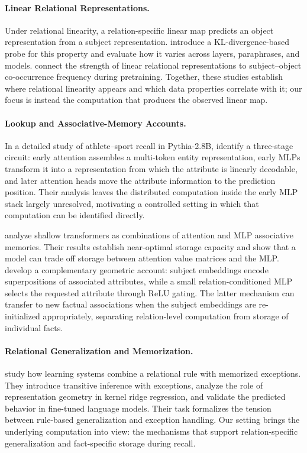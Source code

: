 
\paragraph{Linear Relational Representations.} Under relational linearity, a
relation-specific linear map predicts an object representation from a subject
representation. \citet{valer2026relational}
introduce a KL-divergence-based probe for this property and evaluate how it
varies across layers, paraphrases, and models. \citet{merullo2025frequency}
connect the strength of linear relational representations to subject--object
co-occurrence frequency during pretraining. Together, these studies establish
where relational linearity appears and which data properties correlate with it;
our focus is instead the computation that produces the observed linear map.

\paragraph{Lookup and Associative-Memory Accounts.}

In a detailed study of athlete--sport recall in Pythia-2.8B,
\citet{nanda2023factfinding} identify a three-stage circuit: early attention
assembles a multi-token entity representation, early MLPs transform it into a
representation from which the attribute is linearly decodable, and later
attention heads move the attribute information to the prediction position. Their
analysis leaves the distributed computation inside the early MLP stack largely
unresolved, motivating a controlled setting in which that computation can be
identified directly.

\citet{nichani2024associative} analyze shallow transformers as combinations of
attention and MLP associative memories. Their results establish near-optimal
storage capacity and show that a model can trade off storage between attention
value matrices and the MLP. \citet{ravfogel2026geometric} develop a complementary
geometric account: subject embeddings encode superpositions of associated
attributes, while a small relation-conditioned MLP selects the requested
attribute through ReLU gating. The latter mechanism can transfer to new factual
associations when the subject embeddings are re-initialized appropriately,
separating relation-level computation from storage of individual facts.

\paragraph{Relational Generalization and Memorization.}

\citet{cheng2026balancing} study how learning systems combine a relational rule
with memorized exceptions. They introduce transitive inference with exceptions,
analyze the role of representation geometry in kernel ridge regression, and
validate the predicted behavior in fine-tuned language models. Their task
formalizes the tension between rule-based generalization and exception handling.
Our setting brings the underlying computation into view: the mechanisms that
support relation-specific generalization and fact-specific storage during recall.
